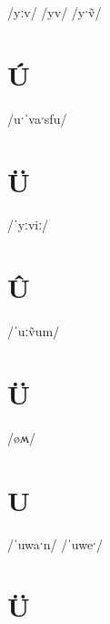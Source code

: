 \documentclass[10pt,a4paper,twoside]{book}
\begin{document}
\begin{multicols}{3}
 {/yːv/} {}
 {/yv/} {}
 {/yˑṽ/} {}
\end{multicols}

\section*{Ú}

\begin{multicols}{3}
 {/uˑˈvaˑsfu/} {}
\end{multicols}

\section*{Ü}

\begin{multicols}{3}
 {/ˈyːviː/} {}
\end{multicols}

\section*{Û}

\begin{multicols}{3}
 {/ˈuːṽum/} {}
\end{multicols}

\section*{Ü}

\begin{multicols}{3}
 {/øʍ/} {}
\end{multicols}

\section*{U}

\begin{multicols}{3}
 {/ˈuwaˑn/} {}
 {/ˈuweˑ/} {}
\end{multicols}

\section*{Ü}
\end{document}
